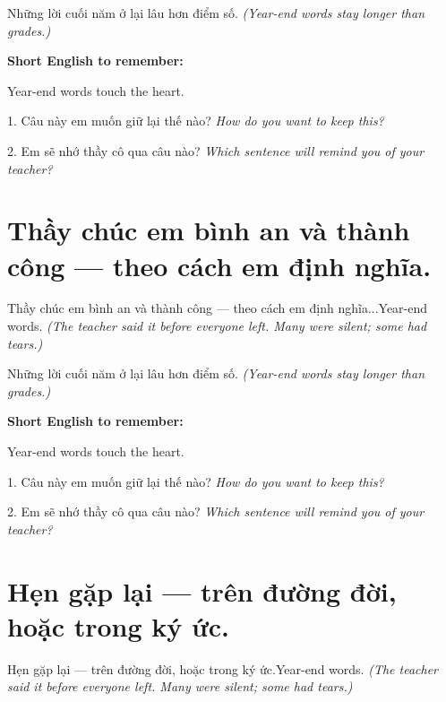\begin{baihoc}
Những lời cuối năm ở lại lâu hơn điểm số.
\textit{(Year-end words stay longer than grades.)}
\end{baihoc}

\begin{ghinhoanh}
\textbf{Short English to remember:}

Year-end words touch the heart.

\end{ghinhoanh}

\begin{tuhocnhanh}
1. Câu này em muốn giữ lại thế nào? \textit{How do you want to keep this?}

2. Em sẽ nhớ thầy cô qua câu nào? \textit{Which sentence will remind you of your teacher?}
\end{tuhocnhanh}
\ngancach


\section{Thầy chúc em bình an và thành công — theo cách em định nghĩa.}
\begin{truyen}{Thầy chúc em bình an và thành công — theo cách em định nghĩa...}{Year-end words.}
\textit{(The teacher said it before everyone left. Many were silent; some had tears.)}
\end{truyen}

\begin{baihoc}
Những lời cuối năm ở lại lâu hơn điểm số.
\textit{(Year-end words stay longer than grades.)}
\end{baihoc}

\begin{ghinhoanh}
\textbf{Short English to remember:}

Year-end words touch the heart.

\end{ghinhoanh}

\begin{tuhocnhanh}
1. Câu này em muốn giữ lại thế nào? \textit{How do you want to keep this?}

2. Em sẽ nhớ thầy cô qua câu nào? \textit{Which sentence will remind you of your teacher?}
\end{tuhocnhanh}
\ngancach


\section{Hẹn gặp lại — trên đường đời, hoặc trong ký ức.}
\begin{truyen}{Hẹn gặp lại — trên đường đời, hoặc trong ký ức.}{Year-end words.}
\textit{(The teacher said it before everyone left. Many were silent; some had tears.)}
\end{truyen}

